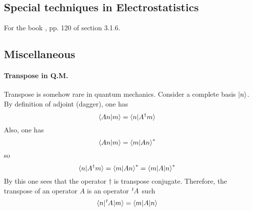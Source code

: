 \subsection{Special techniques in Electrostatistics}
\label{sec:Special-techniques-in-Electrostatistics}

For the book \cite{griffiths-EM}, pp. 120 of section 3.1.6. 
\subsection{Miscellaneous}
\label{sec:Miscellaneous}

\paragraph{Transpose in Q.M.}

Transpose is somehow rare in quantum mechanics. Consider a complete
basis $\ket{n}$. By definition of adjoint (dagger), one has
\begin{equation}
    \braket{ An|m }=\braket{n | A^\dagger m}
\end{equation}
Also, one has
\begin{equation}
    \braket{ An|m } = \braket{ m|An }^*
\end{equation}
so
\begin{equation}
    \braket{ n|A^\dagger m } = \braket{ m|An }^* = \braket{ m|A|n }^*
\end{equation}
By this one sees that the operator $\dagger$ is transpose conjugate.
Therefore, the transpose of an operator $A$ is an operator
$\tensor[^t]{A}{}$ such
\begin{equation}
    \braket{ n|\tensor[^t]{A}{}|m } = \braket{ m|A|n }
\end{equation}
